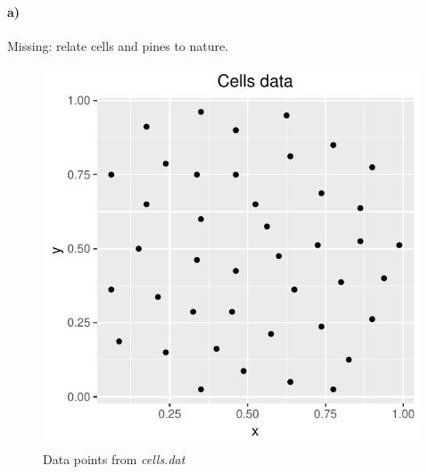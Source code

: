 \section{}
\label{sec:problem1}
\paragraph{a)} Missing: relate cells and pines to nature.

\begin{figure}
    \centering
    \includegraphics[scale=0.95]{figures/prob1_cells_points.pdf}
    \caption{Data points from \textit{cells.dat}}
    \label{fig:cells_points}
\end{figure}

